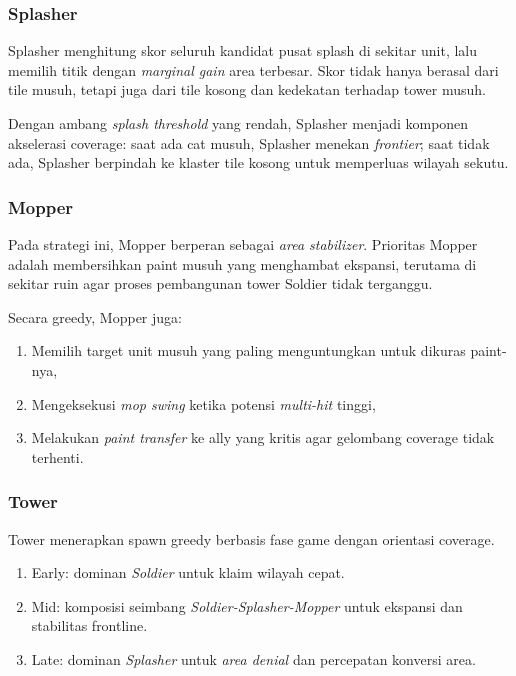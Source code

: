 \subsubsection{Splasher}

Splasher menghitung skor seluruh kandidat pusat splash di sekitar unit, lalu memilih titik dengan \textit{marginal gain} area terbesar. Skor tidak hanya berasal dari tile musuh, tetapi juga dari tile kosong dan kedekatan terhadap tower musuh.

Dengan ambang \textit{splash threshold} yang rendah, Splasher menjadi komponen akselerasi coverage: saat ada cat musuh, Splasher menekan \textit{frontier}; saat tidak ada, Splasher berpindah ke klaster tile kosong untuk memperluas wilayah sekutu.

\subsubsection{Mopper}

Pada strategi ini, Mopper berperan sebagai \textit{area stabilizer}. Prioritas Mopper adalah membersihkan paint musuh yang menghambat ekspansi, terutama di sekitar ruin agar proses pembangunan tower Soldier tidak terganggu.

Secara greedy, Mopper juga:
\begin{enumerate}
    \item Memilih target unit musuh yang paling menguntungkan untuk dikuras paint-nya,
    \item Mengeksekusi \textit{mop swing} ketika potensi \textit{multi-hit} tinggi,
    \item Melakukan \textit{paint transfer} ke ally yang kritis agar gelombang coverage tidak terhenti.
\end{enumerate}

\subsubsection{Tower}

Tower menerapkan spawn greedy berbasis fase game dengan orientasi coverage.
\begin{enumerate}
    \item Early: dominan \textit{Soldier} untuk klaim wilayah cepat.
    \item Mid: komposisi seimbang \textit{Soldier-Splasher-Mopper} untuk ekspansi dan stabilitas frontline.
    \item Late: dominan \textit{Splasher} untuk \textit{area denial} dan percepatan konversi area.
\end{enumerate}

